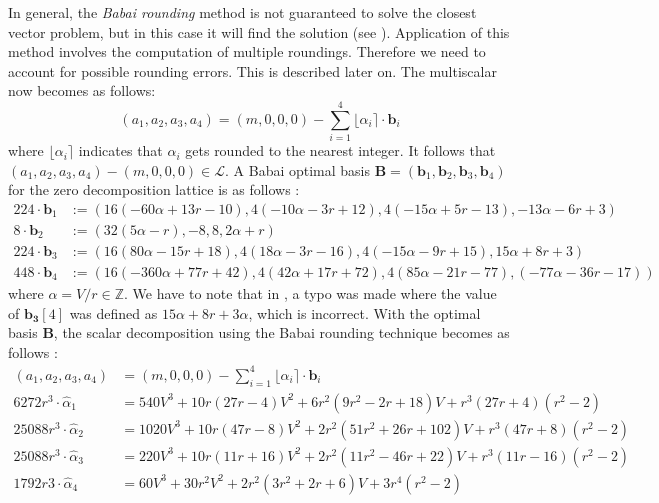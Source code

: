 In general, the \emph{Babai rounding} method is not guaranteed to solve the closest vector problem, but in this case it will find the solution (see \cite[§4.1]{costello2015fourq}). 
Application of this method involves the computation of multiple roundings.
Therefore we need to account for possible rounding errors.
This is described later on.
The multiscalar now becomes as follows:
%
\begin{equation*}
(a_1, a_2, a_3, a_4) = (m, 0, 0,0 ) - \sum_{i=1}^{4} \lfloor \alpha_i \rceil \cdot \bm{b}_i
\end{equation*}
%
where $\lfloor \alpha_i \rceil$ indicates that $\alpha_i$ gets rounded to the nearest integer.
It follows that $(a_1, a_2, a_3, a_4) - (m, 0, 0, 0) \in \mathcal{L}$.
A Babai optimal basis $\bm{B} = (\bm{b}_1, \bm{b}_2, \bm{b}_3, \bm{b}_4)$ for the zero decomposition lattice is as follows \cite{costello2015fourq}:
%
\begin{align*}
224 \cdot \bm{b}_1 &:= \left( 16(-60\alpha + 13r - 10), 4(-10\alpha - 3r + 12), 4(-15 \alpha + 5r - 13), -13 \alpha - 6r + 3 \right) \\
8 \cdot \bm{b}_2 &:= (32(5\alpha - r), -8, 8, 2\alpha + r) \\
224 \cdot \bm{b}_3 &:= (16(80\alpha - 15r + 18), 4(18\alpha - 3r - 16), 4(-15 \alpha - 9r + 15), 15 \alpha + 8r + 3) \\
448 \cdot \bm{b}_4 &:= (16(-360 \alpha + 77r + 42),  4(42 \alpha + 17r + 72), 4(85\alpha - 21r - 77), (-77\alpha - 36r - 17))
\end{align*}
%
where $\alpha = V/r \in \mathbb{Z}$.
We have to note that in \cite{costello2015fourq}, a typo was made where the value of $\bm{b_3}[4]$ was defined as $15 \alpha + 8r + 3 \alpha$, which is incorrect.
With the optimal basis $\bm{B}$, the scalar decomposition using the Babai rounding technique becomes as follows \cite{costello2015fourq}:
%
\begin{align*}
(a_1, a_2, a_3, a_4) &= (m, 0, 0,0 ) - \sum_{i=1}^{4} \lfloor \alpha_i \rceil \cdot \bm{b}_i \\
6272r^3 \cdot \hat{\alpha}_1 &= 540V^3 + 10r(27r - 4)V^2 + 6r^2(9r^2 - 2r + 18)V + r^3(27r + 4)(r^2 - 2) \\
25088r^3 \cdot \hat{\alpha}_2 &= 1020V^3 + 10r(47r - 8)V^2 + 2r^2(51r^2 + 26r + 102)V + r^3(47r + 8)(r^2 - 2) \\
25088r^3 \cdot \hat{\alpha}_3 &= 220V^3 + 10r(11r + 16)V^2 + 2r^2(11r^2 - 46r + 22)V + r^3(11r - 16)(r^2 - 2) \\
1792r3 \cdot \hat{\alpha}_4 &= 60V^3 + 30r^2V^2 + 2r^2(3r^2 + 2r + 6)V + 3r^4(r^2 - 2) 
\end{align*}
